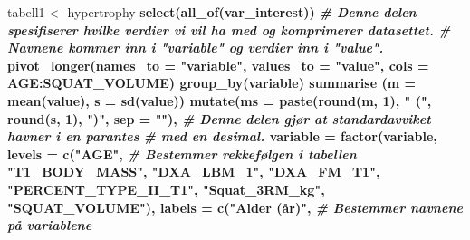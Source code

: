 \documentclass[
]{article}
\newenvironment{Shaded}{\begin{snugshade}}{\end{snugshade}}
\newcommand{\CommentTok}[1]{\textcolor[rgb]{0.56,0.35,0.01}{\textit{#1}}}
\newcommand{\DataTypeTok}[1]{\textcolor[rgb]{0.13,0.29,0.53}{#1}}
\newcommand{\DecValTok}[1]{\textcolor[rgb]{0.00,0.00,0.81}{#1}}
\newcommand{\KeywordTok}[1]{\textcolor[rgb]{0.13,0.29,0.53}{\textbf{#1}}}
\newcommand{\NormalTok}[1]{#1}
\newcommand{\OperatorTok}[1]{\textcolor[rgb]{0.81,0.36,0.00}{\textbf{#1}}}
\newcommand{\StringTok}[1]{\textcolor[rgb]{0.31,0.60,0.02}{#1}}
\begin{document}
\begin{Shaded}
\begin{Highlighting}[]
\NormalTok{tabell1 <-}\StringTok{ }\NormalTok{hypertrophy }\OperatorTok{%>%}\StringTok{ }\CommentTok{# Kobler datasettet hypetrophy til objektet hyptable slik at vi kan lage en tabell uten å påvirke hypertrophy datasettet.}
\StringTok{  }
\StringTok{  }\KeywordTok{select}\NormalTok{(}\KeywordTok{all_of}\NormalTok{(var_interest)) }\OperatorTok{%>%}\StringTok{ }\CommentTok{# Selekterer variablene fra var_interest.}
\StringTok{  }
\StringTok{  }
\StringTok{  }\CommentTok{# Denne delen spesifiserer hvilke verdier vi vil ha med og komprimerer datasettet.}
\StringTok{  }\CommentTok{# Navnene kommer inn i "variable" og verdier inn i "value".}
\StringTok{  }\KeywordTok{pivot_longer}\NormalTok{(}\DataTypeTok{names_to =} \StringTok{"variable"}\NormalTok{,}
               \DataTypeTok{values_to =} \StringTok{"value"}\NormalTok{,}
               \DataTypeTok{cols =}\NormalTok{ AGE}\OperatorTok{:}\NormalTok{SQUAT_VOLUME) }\OperatorTok{%>%}
\StringTok{  }\KeywordTok{group_by}\NormalTok{(variable) }\OperatorTok{%>%}
\StringTok{  }\KeywordTok{summarise}\NormalTok{ (}\DataTypeTok{m =} \KeywordTok{mean}\NormalTok{(value),}
             \DataTypeTok{s =} \KeywordTok{sd}\NormalTok{(value)) }\OperatorTok{%>%}\StringTok{  }\CommentTok{#Regner ut gjennomsnittet og standardavviket.}
\StringTok{  }
\StringTok{  }\KeywordTok{mutate}\NormalTok{(}\DataTypeTok{ms =} \KeywordTok{paste}\NormalTok{(}\KeywordTok{round}\NormalTok{(m, }\DecValTok{1}\NormalTok{), }
                    \StringTok{" ("}\NormalTok{,}
                    \KeywordTok{round}\NormalTok{(s, }\DecValTok{1}\NormalTok{),}
                    \StringTok{")"}\NormalTok{, }\DataTypeTok{sep =} \StringTok{""}\NormalTok{), }\CommentTok{# Denne delen gjør at standardavviket havner i en parantes}
         \CommentTok{# med en desimal.}
         \DataTypeTok{variable =} \KeywordTok{factor}\NormalTok{(variable, }
                           \DataTypeTok{levels =} \KeywordTok{c}\NormalTok{(}\StringTok{"AGE"}\NormalTok{, }\CommentTok{# Bestemmer rekkefølgen i tabellen}
                                      \StringTok{"T1_BODY_MASS"}\NormalTok{, }
                                      \StringTok{"DXA_LBM_1"}\NormalTok{, }
                                      \StringTok{"DXA_FM_T1"}\NormalTok{, }
                                      \StringTok{"PERCENT_TYPE_II_T1"}\NormalTok{, }
                                      \StringTok{"Squat_3RM_kg"}\NormalTok{, }
                                      \StringTok{"SQUAT_VOLUME"}\NormalTok{), }
                           \DataTypeTok{labels =} \KeywordTok{c}\NormalTok{(}\StringTok{"Alder (år)"}\NormalTok{, }\CommentTok{# Bestemmer navnene på variablene}
}}}}}
\end{Highlighting}
\end{Shaded}
\end{document}
